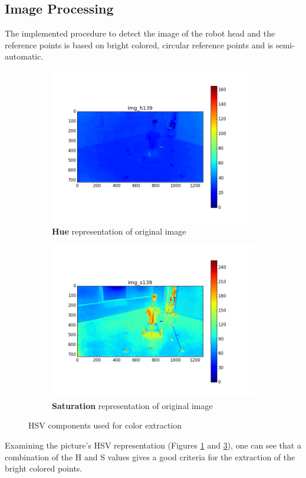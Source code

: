 \subsection{Image Processing}
\label{sec:imageprocessing}

The implemented procedure to detect the image of the robot head and the reference points is based on bright colored, circular reference points and is semi-automatic.

\begin{figure}[htb]
	\begin{subfigure}[b]{0.49\linewidth}
        \centering
		\includegraphics[width=\linewidth]{files/_img_h139.png}
		\caption{\textbf{Hue} representation of original image}
		\label{fig:img_h}
	\end{subfigure}
	\begin{subfigure}[b]{0.49\linewidth}
        \centering
		\includegraphics[width=\linewidth]{files/_img_s139.png}
		\caption{\textbf{Saturation} representation of original image}
		\label{fig:img_s}
	\end{subfigure}
    \caption{HSV components used for color extraction}
\end{figure}
Examining the picture's HSV representation (Figures \ref{fig:img_h} and \ref{fig:img_s}), one can see that a combination of the H and S values gives a good criteria for the extraction of the bright colored points. 

